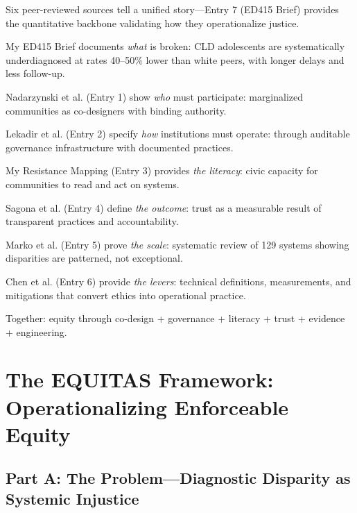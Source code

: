 \documentclass[12pt,a4paper]{article}
\begin{document}
\begin{tcolorbox}[colback=noteback,colframe=noteborder,title=\textbf{The Convergence: From Theory to Auditable Practice}]
Six peer-reviewed sources tell a unified story—Entry 7 (ED415 Brief) provides the quantitative backbone validating how they operationalize justice.

My ED415 Brief documents \textit{what} is broken: CLD adolescents are systematically underdiagnosed at rates 40--50\% lower than white peers, with longer delays and less follow-up.\cite{garcia_ed415}

Nadarzynski et al. (Entry 1) show \textit{who} must participate: marginalized communities as co-designers with binding authority.\cite{nadarzynski2024}

Lekadir et al. (Entry 2) specify \textit{how} institutions must operate: through auditable governance infrastructure with documented practices.\cite{lekadir2025}

My Resistance Mapping (Entry 3) provides \textit{the literacy}: civic capacity for communities to read and act on systems.\cite{garcia_ed415}

Sagona et al. (Entry 4) define \textit{the outcome}: trust as a measurable result of transparent practices and accountability.\cite{sagona2025}

Marko et al. (Entry 5) prove \textit{the scale}: systematic review of 129 systems showing disparities are patterned, not exceptional.\cite{marko2025}

Chen et al. (Entry 6) provide \textit{the levers}: technical definitions, measurements, and mitigations that convert ethics into operational practice.\cite{chen2023}

Together: equity through co-design + governance + literacy + trust + evidence + engineering.
\end{tcolorbox}

\section{The EQUITAS Framework: Operationalizing Enforceable Equity}

\subsection{Part A: The Problem—Diagnostic Disparity as Systemic Injustice}
\end{document}
